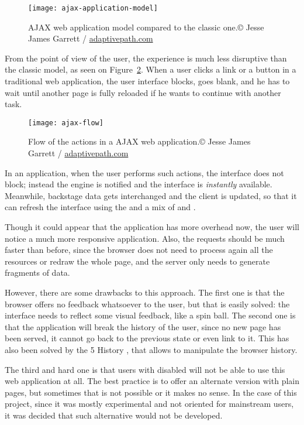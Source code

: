 \begin{figure}[htbp]
  \centering
    \texttt{[image: ajax-application-model]}
  \caption[AJAX web application model]{AJAX web application model compared to the classic one.\newline© Jesse James Garrett / \url{adaptivepath.com}}
  \label{fig:ajax-application-model}
\end{figure}

From the point of view of the user, the experience is much less disruptive than the classic model, as seen on Figure~\ref{fig:ajax-flow}.
When a user clicks a link or a button in a traditional web application, the user interface blocks, goes blank, and he has to wait until another page is fully reloaded if he wants to continue with another task.

\begin{figure}[htbp]
  \centering
    \texttt{[image: ajax-flow]}
    \caption[AJAX flow]{Flow of the actions in a AJAX web application.\newline© Jesse James Garrett / \url{adaptivepath.com}}
  \label{fig:ajax-flow}
\end{figure}

In an  application, when the user performs such actions, the interface does not block; instead the  engine is notified and the interface is \emph{instantly} available.
Meanwhile, backstage data gets interchanged and the client is updated, so that it can refresh the interface using the  and a mix of  and .

Though it could appear that the application has more overhead now, the user will notice a much more responsive application. Also, the requests should be much faster than before, since the browser does not need to process again all the resources or redraw the whole page, and the server only needs to generate fragments of data.

However, there are some drawbacks to this approach.
The first one is that the browser offers no feedback whatsoever to the user, but that is easily solved: the interface needs to reflect some visual feedback, like a spin ball.
The second one is that the application will break the history of the user, since no new page has been served, it cannot go back to the previous state or even link to it.
This has also been solved by the 5 History , that allows to manipulate the browser history.

The third and hard one is that users with  disabled will not be able to use this web application at all.
The best practice is to offer an alternate version with plain  pages, but sometimes that is not possible or it makes no sense.
In the case of this project, since it was mostly experimental and not oriented for mainstream users, it was decided that such alternative would not be developed.

